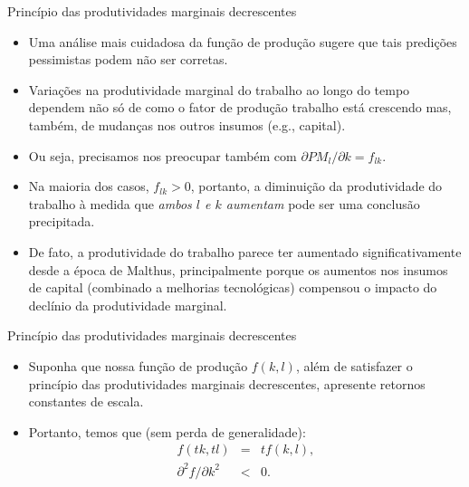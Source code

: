 \documentclass[10pt]{beamer}
\begin{document}
\begin{frame}{Princípio das produtividades marginais decrescentes}
    \begin{itemize}
        \item Uma análise mais cuidadosa da função de produção sugere que tais predições pessimistas podem não ser corretas.
        \bigskip
        \item Variações na produtividade marginal do trabalho ao longo do tempo dependem não só de como o fator de produção trabalho está crescendo mas, também, de mudanças nos outros insumos (e.g., capital).
        \bigskip
        \item Ou seja, precisamos nos preocupar também com $\partial PM_l/\partial k = f_{lk}$.
        \bigskip
        \item Na maioria dos casos, $f_{lk} > 0$, portanto, a diminuição da produtividade do trabalho à medida que \emph{ambos $l$ e $k$ aumentam} pode ser uma conclusão precipitada.
        \bigskip
        \item De fato, a produtividade do trabalho parece ter aumentado significativamente desde a época de Malthus, principalmente porque os aumentos nos insumos de capital (combinado a melhorias tecnológicas) compensou o impacto do declínio da produtividade marginal.
    \end{itemize}
\end{frame}

\begin{frame}{Princípio das produtividades marginais decrescentes}
    \begin{itemize}
        \item Suponha que nossa função de produção $f(k,l)$, além de satisfazer o princípio das produtividades marginais decrescentes, apresente retornos constantes de escala.
        \bigskip
        \item Portanto, temos que (sem perda de generalidade):
        \begin{eqnarray*}
            f(tk, tl) &=& tf(k,l), \\
            \partial^2 f/\partial k^2 &<& 0.
        \end{eqnarray*}
    \end{itemize}
\end{frame}
\end{document}
